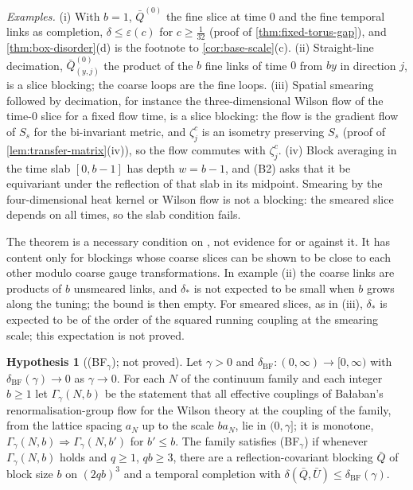 \documentclass[11pt,a4paper]{amsart}
\theoremstyle{definition}
\newtheorem{hypothesis}[theorem]{Hypothesis}
\theoremstyle{remark}
\numberwithin{equation}{section}
\newcommand{\cube}[1]{(2#1)^3}             %
\newcommand{\Mcirc}{\text{\upshape(M$^{\circ}$)}}   %
\newcommand{\aN}{a_N}                      %
\begin{document}
\emph{Examples.} (i) With $b=1$, $\bar Q^{(0)}$ the fine slice at time $0$ and the fine temporal links as completion, $\delta\le\varepsilon(c)$ for $c\ge\frac1{32}$ (proof of \cref{thm:fixed-torus-gap}), and \cref{thm:box-disorder}(d) is the footnote to \cref{cor:base-scale}(c). (ii) Straight-line decimation, $\bar Q^{(0)}_{(y,j)}$ the product of the $b$ fine links of time $0$ from $by$ in direction $j$, is a slice blocking; the coarse loops are the fine loops. (iii) Spatial smearing followed by decimation, for instance the three-dimensional Wilson flow of the time-$0$ slice for a fixed flow time, is a slice blocking: the flow is the gradient flow of $S_s$ for the bi-invariant metric, and $\zeta^c_j$ is an isometry preserving $S_s$ (proof of \cref{lem:transfer-matrix}(iv)), so the flow commutes with $\zeta^c_j$. (iv) Block averaging in the time slab $[0,b-1]$ has depth $w=b-1$, and \textup{(B2)} asks that it be equivariant under the reflection of that slab in its midpoint. Smearing by the four-dimensional heat kernel or Wilson flow is not a blocking: the smeared slice depends on all times, so the slab condition fails.

The theorem is a necessary condition on \Mcirc{}, not evidence for or against it. It has content only for blockings whose coarse slices can be shown to be close to each other modulo coarse gauge transformations. In example (ii) the coarse links are products of $b$ unsmeared links, and $\delta_*$ is not expected to be small when $b$ grows along the tuning; the bound is then empty. For smeared slices, as in (iii), $\delta_*$ is expected to be of the order of the squared running coupling at the smearing scale; this expectation is not proved.

\begin{hypothesis}[\textup{(BF$_\gamma$)}; not proved]\label{hyp:BF}
Let $\gamma>0$ and $\delta_{\mathrm{BF}}\colon(0,\infty)\to[0,\infty)$ with $\delta_{\mathrm{BF}}(\gamma)\to0$ as $\gamma\to0$. For each $N$ of the continuum family and each integer $b\ge1$ let $\Gamma_\gamma(N,b)$ be the statement that all effective couplings of Ba{\l}aban's renormalisation-group flow \cite{balaban1987,balaban1988a,balaban1988b,balaban1989a,balaban1989b} for the Wilson theory at the coupling of the family, from the lattice spacing $\aN$ up to the scale $b\aN$, lie in $(0,\gamma]$; it is monotone, $\Gamma_\gamma(N,b)\Rightarrow\Gamma_\gamma(N,b')$ for $b'\le b$. The family satisfies \textup{(BF$_\gamma$)} if whenever $\Gamma_\gamma(N,b)$ holds and $q\ge1$, $qb\ge3$, there are a reflection-covariant blocking $\bar Q$ of block size $b$ on $\cube{qb}$ and a temporal completion with $\delta(\bar Q,\bar U)\le\delta_{\mathrm{BF}}(\gamma)$.
\end{hypothesis}
\end{document}
